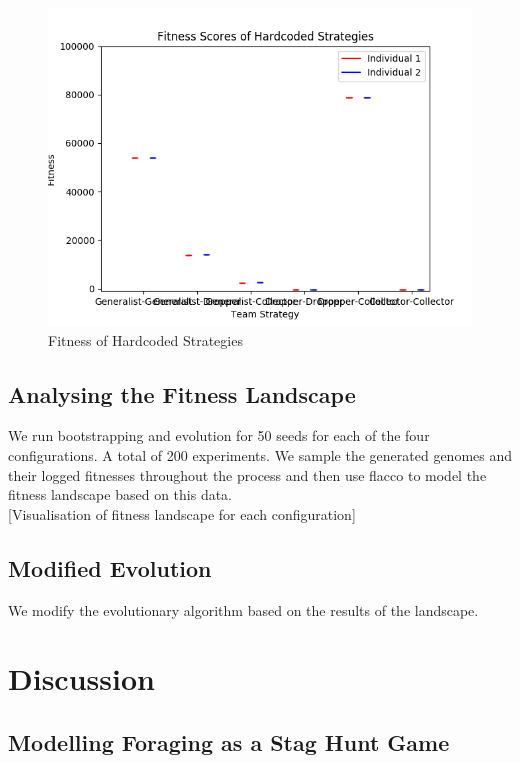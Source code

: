 \documentclass[12pt]{article}  %
\begin{document}
\begin{figure}
	\centering
	\includegraphics[width=\textwidth]{hardcoded_fitness.png}
	\caption{Fitness of Hardcoded Strategies}
	\label{fig:hardcoded}
\end{figure}



\subsection{Analysing the Fitness Landscape}
We run bootstrapping and evolution for 50 seeds for each of the four configurations. A total of 200 experiments. 
We sample the generated genomes and their logged fitnesses throughout the process and then use flacco to model the fitness landscape based on this data.\\

[Visualisation of fitness landscape for each configuration]

\subsection{Modified Evolution}

We modify the evolutionary algorithm based on the results of the landscape.

\section{Discussion}

\subsection{Modelling Foraging as a Stag Hunt Game}
\end{document}
